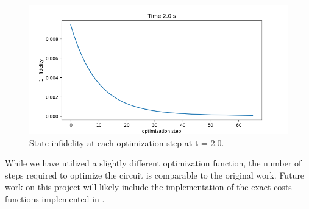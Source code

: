 \documentclass{article}
\begin{document}
\begin{figure}[!htb]
    \centering
        \includegraphics[width=5in]{cost_function_v_step_t2.0.png}
        \caption{State infidelity at each optimization step at t = 2.0.}
        \label{infidel_v_step_2.0}
\end{figure}

While we have utilized a slightly different optimization function, the number of steps required to optimize the circuit is comparable to the original work. Future work on this project will likely include the implementation of the exact costs functions implemented in \cite{Barison_2021}.
\end{document}
